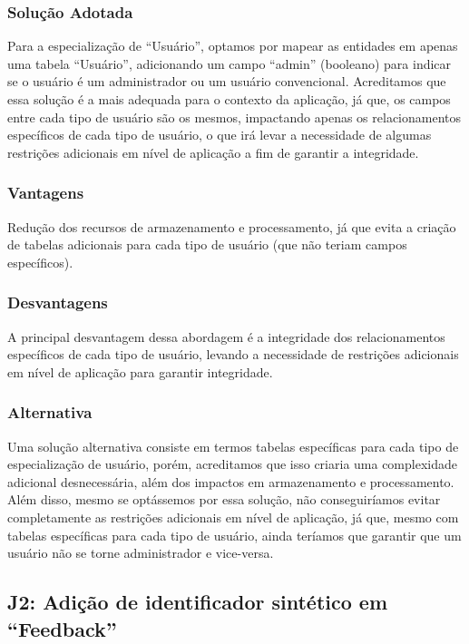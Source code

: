 \subsubsection{Solução Adotada}

Para a especialização de ``Usuário'', optamos por mapear as entidades em apenas
uma tabela ``Usuário'', adicionando um campo ``admin'' (booleano) para indicar
se o usuário é um administrador ou um usuário convencional. Acreditamos que
essa solução é a mais adequada para o contexto da aplicação, já que, os campos
entre cada tipo de usuário são os mesmos, impactando apenas os relacionamentos
específicos de cada tipo de usuário, o que irá levar a necessidade de algumas
restrições adicionais em nível de aplicação a fim de garantir a integridade.

\subsubsection{Vantagens}

Redução dos recursos de armazenamento e processamento, já que evita a criação
de tabelas adicionais para cada tipo de usuário (que não teriam campos
específicos).

\subsubsection{Desvantagens}

A principal desvantagem dessa abordagem é a integridade dos relacionamentos
específicos de cada tipo de usuário, levando a necessidade de restrições
adicionais em nível de aplicação para garantir integridade.

\subsubsection{Alternativa}

Uma solução alternativa consiste em termos tabelas específicas para cada tipo
de especialização de usuário, porém, acreditamos que isso criaria uma
complexidade adicional desnecessária, além dos impactos em armazenamento e
processamento. Além disso, mesmo se optássemos por essa solução, não
conseguiríamos evitar completamente as restrições adicionais em nível de
aplicação, já que, mesmo com tabelas específicas para cada tipo de usuário,
ainda teríamos que garantir que um usuário não se torne administrador e
vice-versa.

\subsection{\textbf{J2:} Adição de identificador sintético em ``Feedback''}

